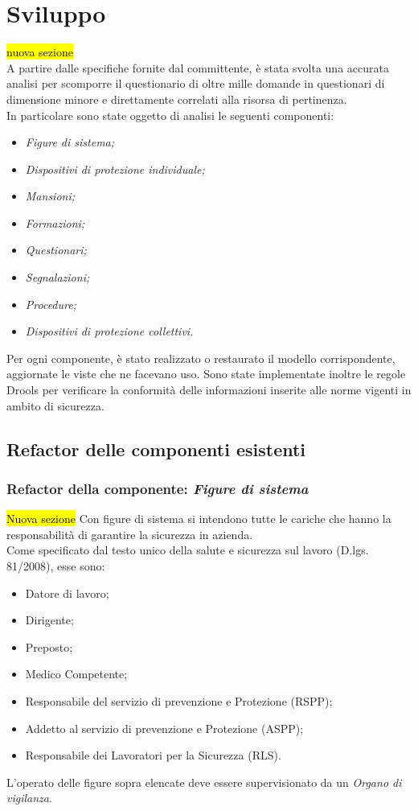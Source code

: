 
\section{Sviluppo}
\hl{nuova sezione} \\
A partire dalle specifiche fornite dal committente, è stata svolta una accurata analisi per scomporre il questionario di oltre mille domande in questionari di dimensione minore e direttamente correlati alla risorsa di pertinenza.\\
In particolare sono state oggetto di analisi le seguenti componenti:
\begin{itemize}
	\item \textit{Figure di sistema;}
	\item \textit{Dispositivi di protezione individuale;}
	\item \textit{Mansioni;}
	\item \textit{Formazioni;}
	\item \textit{Questionari;}
	\item \textit{Segnalazioni;}
	\item \textit{Procedure;}
	\item \textit{Dispositivi di protezione collettivi.}
\end{itemize}
Per ogni componente, è stato realizzato o restaurato il modello corrispondente, aggiornate le viste che ne facevano uso. Sono state implementate inoltre le regole Drools per verificare la conformità delle informazioni inserite alle norme vigenti in ambito di sicurezza.
\subsection{Refactor delle componenti esistenti}
	
	
\subsubsection{Refactor della componente: \textit{Figure di sistema}}
\hl{Nuova sezione}
	Con figure di sistema si intendono tutte le cariche che hanno la responsabilità di garantire la sicurezza in azienda. \\
	Come specificato dal testo unico della salute e sicurezza sul lavoro (D.lgs. 81/2008), esse sono: 
	\begin{itemize}
		\item Datore di lavoro;
		\item Dirigente;
		\item Preposto;
		\item Medico Competente;
		\item Responsabile del servizio di prevenzione e Protezione (RSPP);
		\item Addetto al servizio di prevenzione e Protezione (ASPP);
		\item Responsabile dei Lavoratori per la Sicurezza (RLS).
	\end{itemize}
	L'operato delle figure sopra elencate deve essere supervisionato da un \textit{Organo di vigilanza}.

